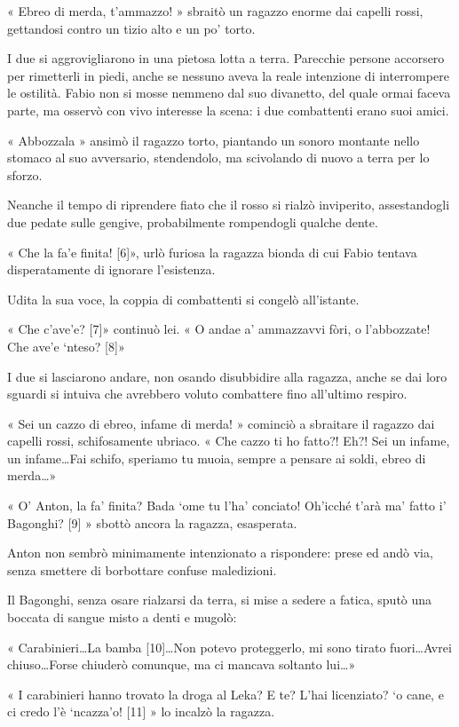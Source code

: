 « Ebreo di merda, t'ammazzo! » sbraitò un ragazzo enorme dai capelli rossi, gettandosi contro un tizio alto e un po' torto.

I due si aggrovigliarono in una pietosa lotta a terra. Parecchie persone accorsero per rimetterli in piedi, anche se nessuno aveva la reale intenzione di interrompere le ostilità. Fabio non si mosse nemmeno dal suo divanetto, del quale ormai faceva parte, ma osservò con vivo interesse la scena: i due combattenti erano suoi amici.

« Abbozzala » ansimò il ragazzo torto, piantando un sonoro montante nello stomaco al suo avversario, stendendolo, ma scivolando di nuovo a terra per lo sforzo.

Neanche il tempo di riprendere fiato che il rosso si rialzò inviperito, assestandogli due pedate sulle gengive, probabilmente rompendogli qualche dente.

« Che la fa'e finita! [6]», urlò furiosa la ragazza bionda di cui Fabio tentava disperatamente di ignorare l'esistenza.

Udita la sua voce, la coppia di combattenti si congelò all'istante.

« Che c'ave'e? [7]» continuò lei. « O andae a' ammazzavvi fòri, o l'abbozzate! Che ave'e `nteso? [8]»

I due si lasciarono andare, non osando disubbidire alla ragazza, anche se dai loro sguardi si intuiva che avrebbero voluto combattere fino all'ultimo respiro.

« Sei un cazzo di ebreo, infame di merda! » cominciò a sbraitare il ragazzo dai capelli rossi, schifosamente ubriaco. « Che cazzo ti ho fatto?! Eh?! Sei un infame, un infame\ldots Fai schifo, speriamo tu muoia, sempre a pensare ai soldi, ebreo di merda\ldots »

« O' Anton, la fa' finita? Bada `ome tu l'ha' conciato! Oh'icché t'arà ma' fatto i' Bagonghi? [9] » sbottò ancora la ragazza, esasperata.

Anton non sembrò minimamente intenzionato a rispondere: prese ed andò via, senza smettere di borbottare confuse maledizioni.

Il Bagonghi, senza osare rialzarsi da terra, si mise a sedere a fatica, sputò una boccata di sangue misto a denti e mugolò:

« Carabinieri\ldots La bamba [10]\ldots Non potevo proteggerlo, mi sono tirato fuori\ldots Avrei chiuso\ldots Forse chiuderò comunque, ma ci mancava soltanto lui\ldots »

« I carabinieri hanno trovato la droga al Leka? E te? L'hai licenziato? `o cane, e ci credo l'è `ncazza'o! [11] » lo incalzò la ragazza.

